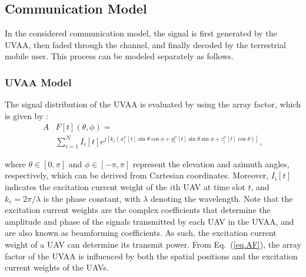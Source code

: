 \documentclass[10pt,journal,compsoc]{IEEEtran}
\begin{document}

\subsection{Communication Model}
\label{subsec:communication model}

\par In the considered communication model, the signal is first generated by the UVAA, then faded through the channel, and finally decoded by the terrestrial mobile user. This process can be modeled separately as follows.

\subsubsection{UVAA Model}
\label{subsubsec: Array factor of UVAA}

\par The signal distribution of the UVAA is evaluated by using the array factor, which is given by \cite{mozaffari2019}:
\begin{equation}
\begin{split}
    \label{eq.AF}
    A&F[t](\theta, \phi) = \\ &\sum_{i=1}^{N} I_{i}[t] e^{j \left[ k_c(x_{i}^{U}[t] \sin\theta \cos\phi + y_{i}^{U}[t] \sin\theta \sin\phi + z_{i}^{U}[t] \cos\theta) \right]},
\end{split}
\end{equation}

\noindent where $\theta \in [0, \pi]$ and $\phi \in [-\pi, \pi]$ represent the elevation and azimuth angles, respectively, which can be derived from Cartesian coordinates. Moreover, $I_{i}[t]$ indicates the excitation current weight of the $i$th UAV at time slot $t$, and $k_c = 2\pi/\lambda$ is the phase constant, with $\lambda$ denoting the wavelength. Note that the excitation current weights are the complex coefficients that determine the amplitude and phase of the signals transmitted by each UAV in the UVAA, and are also known as beamforming coefficients. As such, the excitation current weight of a UAV can determine its transmit power. From Eq.~(\ref{eq.AF}), the array factor of the UVAA is influenced by both the spatial positions and the excitation current weights of the UAVs. 
\end{document}
